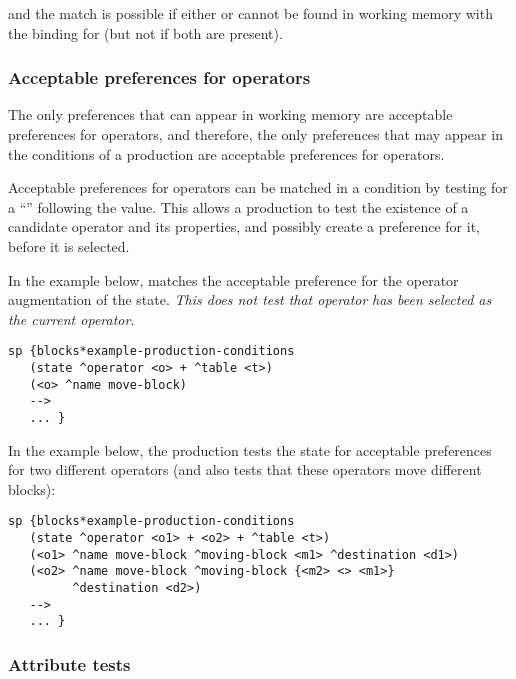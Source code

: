 and the match is possible if either  or  cannot be found in working memory with the binding for  (but not if both are present).

\subsubsection{Acceptable preferences for operators}
\label{SYNTAX-pm-lhs-acceptable}
\index{+}

The only preferences that can appear in working memory are acceptable preferences for operators, and therefore, the only preferences that may appear in the conditions of a production are acceptable preferences for operators.

Acceptable preferences for operators can be matched in a condition by testing for a ``\soar{+}'' following the value.  This allows a production to test the existence of a candidate operator and its properties, and possibly create a preference for it, before it is selected.

In the example below,  matches the acceptable preference for the operator augmentation of the state. \emph{This does not test that operator}  \emph{has been selected as the current operator}.

\begin{verbatim}
sp {blocks*example-production-conditions
   (state ^operator <o> + ^table <t>)
   (<o> ^name move-block)
   -->
   ... }
\end{verbatim}


In the example below, the production tests the state for acceptable preferences for two different operators (and also tests that these operators move different blocks):

\begin{verbatim}
sp {blocks*example-production-conditions
   (state ^operator <o1> + <o2> + ^table <t>)
   (<o1> ^name move-block ^moving-block <m1> ^destination <d1>)
   (<o2> ^name move-block ^moving-block {<m2> <> <m1>} 
         ^destination <d2>)
   -->
   ... }
\end{verbatim}

\subsubsection{Attribute tests}
\label{SYNTAX-pm-lhs-attributes}

